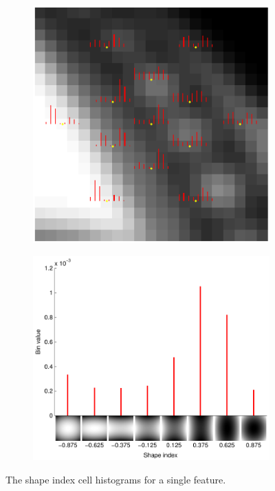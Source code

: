 \documentclass[thesis.tex]{subfiles}
\begin{document}
\begin{figure}[p]
   	\centering
	\begin{subfigure}[t]{0.65\textwidth}
	    \includegraphics[width=\textwidth]{img/cellHistFigureSi.pdf}
    \end{subfigure}
    \begin{subfigure}[t]{0.9\textwidth}
    	\centering
    	\includegraphics[width=\textwidth]{img/cellHistFigureSiExample.pdf}
   	\end{subfigure}
   	\caption{The shape index cell histograms for a single feature.}
    \label{fig:cellHistFigureSiC}
\end{figure}
\end{document}
